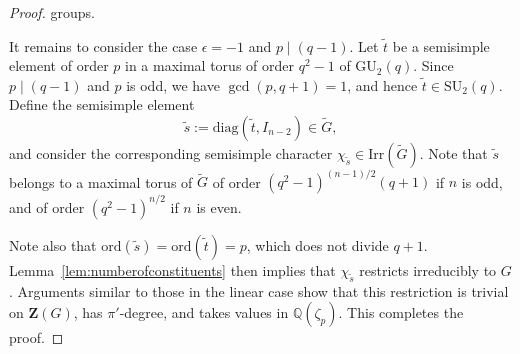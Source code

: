 \documentclass[12pt]{amsart}
\theoremstyle{definition}
\numberwithin{equation}{section}
\newcommand{\GU}{{\mathrm {GU}}}
\newcommand{\SU}{{\mathrm {SU}}}
\newcommand{\Irr}{{\mathrm {Irr}}}
\newcommand{\ord}{{\mathrm {ord}}}
\newcommand{\diag}{{\mathrm {diag}}}
\newcommand{\QQ}{{\mathbb Q}}
\newcommand{\bZ}{{\mathbf{Z}}}
\begin{document}
\begin{proof}
groups.


It remains to consider the case $\epsilon=-1$ %
and $p \mid (q-1)$.
Let \(\widetilde{t}\) be a semisimple element of order \(p\) in a
maximal torus of order $q^2-1$ of \(\GU_2(q)\). Since \(p \mid
(q-1)\) and \(p\) is odd, we have \(\gcd(p,q+1)=1\), and hence
\(\widetilde{t}\in \SU_2(q)\). Define the semisimple element
\[
\widetilde{s}:=\diag\left(\widetilde{t}, I_{n-2}\right)\in
\widetilde{G},
\]
and consider the corresponding semisimple character
\(\chi_{\widetilde{s}}\in \Irr(\widetilde{G})\). Note that
$\widetilde{s}$ belongs to a maximal torus of $\widetilde{G}$ of
order $(q^2-1)^{(n-1)/2}(q+1)$ if $n$ is odd, and of %
order
$(q^2-1)^{n/2}$ if $n$ is even.

Note %
also that \(\ord(\widetilde{s})=\ord(\widetilde{t})=p\), which
does not divide $q+1$. Lemma~\ref{lem:numberofconstituents} then
implies that \(\chi_{\widetilde{s}}\) restricts irreducibly to
\(G\). Arguments similar to those in the linear case show that this
restriction is trivial on \(\bZ(G)\), has \(\pi'\)-degree, and takes
values in \(\QQ(\zeta_p)\). This completes the proof.
\end{proof}
\end{document}
